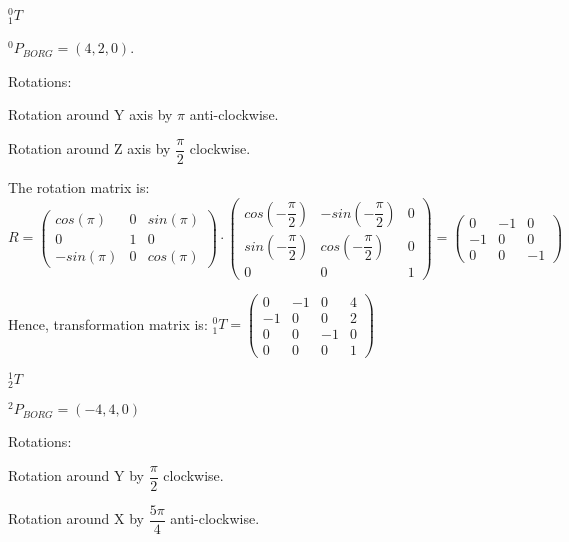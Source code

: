 \documentclass[12pt]{article}
\begin{document}
\begin{list}{)~}{}
\item
$_{1}^{0}T$

$^0 P_{BORG} = \left(4, 2, 0\right)$.

Rotations:

\begin{list}{)~}{}
\item Rotation around Y axis by $\pi$ anti-clockwise.
\item Rotation around Z axis by $\dfrac{\pi}{2}$ clockwise.
\end{list}

The rotation matrix is:
$R=\left(\begin{array}{ccc}
cos(\pi) & 0 & sin(\pi) \\
0 & 1 & 0 \\
-sin(\pi) & 0 & cos(\pi) \end{array}\right) \cdot 
\left(\begin{array}{ccc}
cos \left(- \dfrac{\pi}{2} \right) & -sin \left(- \dfrac{\pi}{2} \right) & 0 \\
sin \left( - \dfrac{\pi}{2} \right) & cos \left( - \dfrac{\pi}{2} \right) & 0 \\
0 & 0 & 1\end{array}\right) = 
\left(\begin{array}{ccc}
0 & -1 & 0 \\
-1 & 0 & 0 \\
0 & 0 & -1\end{array}\right)$

Hence, transformation matrix is:
$_{1}^{0}T = \left(\begin{array}{cccc}
0 & -1 & 0 & 4 \\
-1 & 0 & 0 & 2\\
0 & 0 & -1 & 0\\
0 & 0 & 0 & 1\end{array}\right)$

\item
$_{2}^1T$

$^2 P_{BORG} = \left(-4, 4, 0\right)$

Rotations:
\begin{list}{)~}{}
\item Rotation around Y by $\dfrac{\pi}{2}$ clockwise.
\item Rotation around X by $\dfrac{5 \pi}{4}$ anti-clockwise.
\end{list}


\end{list}
\end{document}
